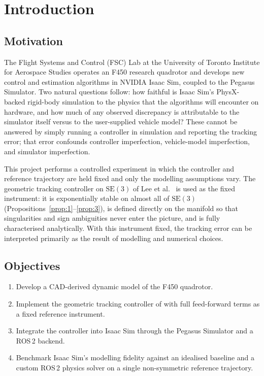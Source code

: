 \documentclass[11pt]{article}
\theoremstyle{remark}
\newcommand{\se}{\mathrm{SE}(3)}
\begin{document}
\section{Introduction}

\subsection{Motivation}
The Flight Systems and Control (FSC) Lab at the University of Toronto Institute for Aerospace Studies operates an F450 research quadrotor and develops new control and estimation algorithms in NVIDIA Isaac Sim, coupled to the Pegasus Simulator. Two natural questions follow: how faithful is Isaac Sim's PhysX-backed rigid-body simulation to the physics that the algorithms will encounter on hardware, and how much of any observed discrepancy is attributable to the simulator itself versus to the user-supplied vehicle model? These cannot be answered by simply running a controller in simulation and reporting the tracking error; that error confounds controller imperfection, vehicle-model imperfection, and simulator imperfection.

This project performs a controlled experiment in which the controller and reference trajectory are held fixed and only the modelling assumptions vary. The geometric tracking controller on $\se$ of Lee et al.~\cite{Lee2010CDC} is used as the fixed instrument: it is exponentially stable on almost all of $\se$ (Propositions~\ref{prop:1}--\ref{prop:3}), is defined directly on the manifold so that singularities and sign ambiguities never enter the picture, and is fully characterised analytically. With this instrument fixed, the tracking error can be interpreted primarily as the result of modelling and numerical choices.

\subsection{Objectives}
\begin{enumerate}[label=(\roman*)]
    \item Develop a CAD-derived dynamic model of the F450 quadrotor.
    \item Implement the geometric tracking controller of \cite{Lee2010CDC} with full feed-forward terms as a fixed reference instrument.
    \item Integrate the controller into Isaac Sim through the Pegasus Simulator and a ROS\,2 backend.
    \item Benchmark Isaac Sim's modelling fidelity against an idealised baseline and a custom ROS\,2 physics solver on a single non-symmetric reference trajectory.
\end{enumerate}
\end{document}
